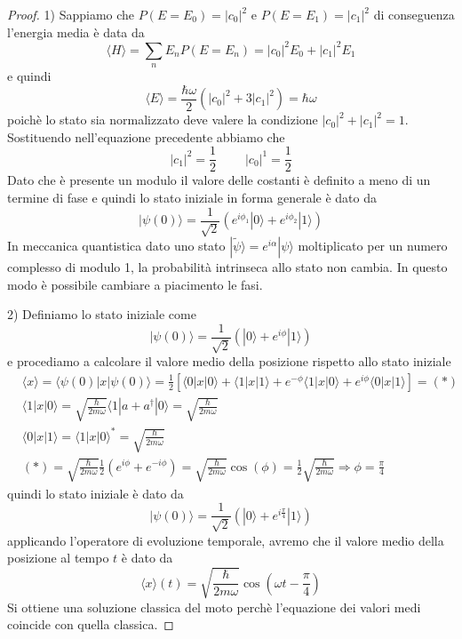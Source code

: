 \begin{proof}
	1) Sappiamo che $P(E=E_0) = |c_0|^2$ e $P(E =E_1)=|c_1|^2$ di conseguenza l'energia media \`e data da 
	\begin{equation*}
		\langle H \rangle = \sum_{n}E_nP(E=E_n) = |c_0|^2E_0 + |c_1|^2E_1 
	\end{equation*}
	e quindi
	\begin{equation*}
		\langle E \rangle = \frac{\hbar \omega}{2}(|c_0|^2+3|c_1|^2) = \hbar \omega
	\end{equation*}
\newpage
poich\`e lo stato sia normalizzato deve valere la condizione $|c_0|^2 + |c_1|^2 =1$. Sostituendo nell'equazione precedente abbiamo che 
\begin{equation*}
	|c_1|^2 = \frac{1}{2} \quad \; \quad |c_0|^1 = \frac{1}{2}
\end{equation*}
Dato che \`e presente un modulo il valore delle costanti \`e definito a meno di un termine di fase e quindi lo stato iniziale in forma generale \`e dato da
\begin{equation*}
	|\psi(0) \rangle = \frac{1}{\sqrt{2}}(e^{i\phi_1}|0 \rangle + e^{i \phi_2}|1\rangle)
\end{equation*}
In meccanica quantistica dato uno stato $|\tilde{\psi} \rangle = e^{i\alpha}|\psi\rangle $ moltiplicato per un numero complesso di modulo 1, la probabilit\`a intrinseca allo stato non cambia. In questo modo \`e possibile cambiare a piacimento le fasi.

2) Definiamo lo stato iniziale come
\begin{equation*}
	|\psi(0) \rangle = \frac{1}{\sqrt{2}}(|0\rangle + e^{i\phi}|1\rangle )
\end{equation*}
e procediamo a calcolare il valore medio della posizione rispetto allo stato iniziale
\begin{align*}
	& \langle x \rangle = \langle \psi(0) |x| \psi(0) \rangle = \frac{1}{2} [\langle 0|x|0\rangle + \langle 1 |x|1\rangle + e^{-\phi}\langle 1|x|0\rangle + e^{i\phi}\langle 0 |x|1\rangle ] = (*) \\[0.5cm]
	& \langle 1|x|0 \rangle = \sqrt{\frac{\hbar}{2m \omega}} \langle 1|a+a^{\dag}|0 \rangle  = \sqrt{\frac{\hbar}{2m \omega}}  \\[0.5cm]
	& \langle 0 |x|1 \rangle = \langle 1|x|0 \rangle^* = \sqrt{\frac{\hbar}{2m \omega}}  \\[0.5cm]
	& (*) = \sqrt{\frac{\hbar}{2m \omega}} \frac{1}{2} (e^{i\phi}+e^{-i\phi}) = \sqrt{\frac{\hbar}{2m \omega}}  \cos(\phi) = \frac{1}{2}\sqrt{\frac{\hbar}{2m \omega}}  \Rightarrow \phi = \frac{\pi}{4}
\end{align*}
quindi lo stato iniziale \`e dato da 
\begin{equation*}
	|\psi(0)\rangle = \frac{1}{\sqrt{2}}(|0\rangle + e^{i \frac{\pi}{4}}|1 \rangle )
\end{equation*}
applicando l'operatore di evoluzione temporale, avremo che il valore medio della posizione al tempo $t$ \`e dato da 
\begin{equation*}
	 \langle x \rangle(t) = \sqrt{\frac{\hbar}{2m \omega}}\cos(\omega t - \frac{\pi}{4}) 
\end{equation*}
Si ottiene una soluzione classica del moto perch\`e l'equazione dei valori medi coincide con quella classica.

\end{proof}


